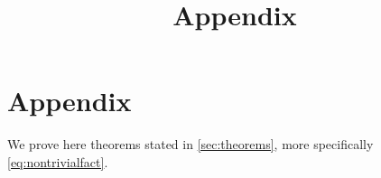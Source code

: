 \documentclass{article}
\title{Appendix}
\begin{document}
\maketitle

\appendix

\section{Appendix}

We prove here theorems stated in \cref{sec:theorems}, more specifically \cref{eq:nontrivialfact}.

\end{document}

